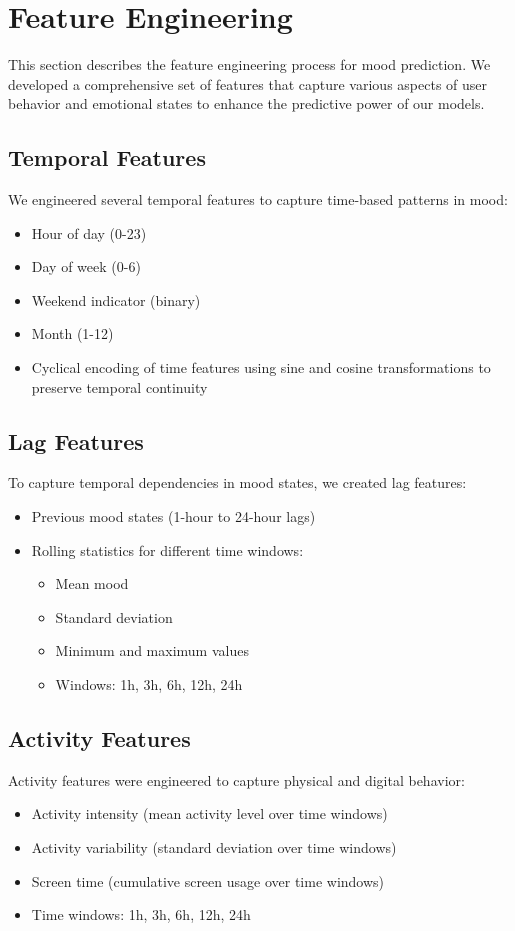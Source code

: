 \section{Feature Engineering}
\label{sec:feature_engineering}

This section describes the feature engineering process for mood prediction. We developed a comprehensive set of features that capture various aspects of user behavior and emotional states to enhance the predictive power of our models.

\subsection{Temporal Features}
We engineered several temporal features to capture time-based patterns in mood:
\begin{itemize}
    \item Hour of day (0-23)
    \item Day of week (0-6)
    \item Weekend indicator (binary)
    \item Month (1-12)
    \item Cyclical encoding of time features using sine and cosine transformations to preserve temporal continuity
\end{itemize}

\subsection{Lag Features}
To capture temporal dependencies in mood states, we created lag features:
\begin{itemize}
    \item Previous mood states (1-hour to 24-hour lags)
    \item Rolling statistics for different time windows:
    \begin{itemize}
        \item Mean mood
        \item Standard deviation
        \item Minimum and maximum values
        \item Windows: 1h, 3h, 6h, 12h, 24h
    \end{itemize}
\end{itemize}

\subsection{Activity Features}
Activity features were engineered to capture physical and digital behavior:
\begin{itemize}
    \item Activity intensity (mean activity level over time windows)
    \item Activity variability (standard deviation over time windows)
    \item Screen time (cumulative screen usage over time windows)
    \item Time windows: 1h, 3h, 6h, 12h, 24h
\end{itemize}

